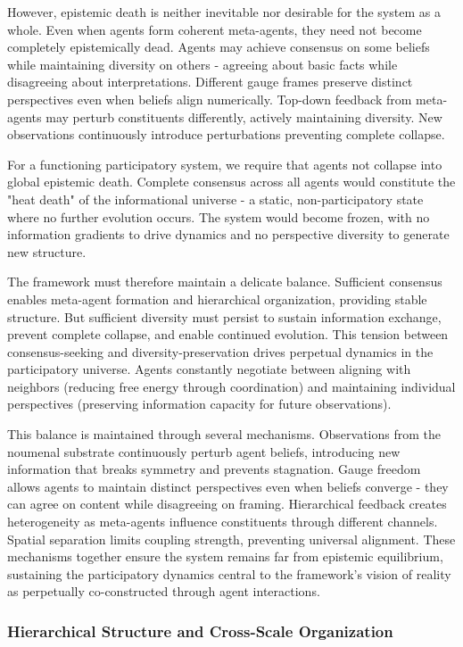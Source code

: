 \documentclass[11pt]{article}
\begin{document}
However, epistemic death is neither inevitable nor desirable for the system as a whole. Even when agents form coherent meta-agents, they need not become completely epistemically dead. Agents may achieve consensus on some beliefs while maintaining diversity on others - agreeing about basic facts while disagreeing about interpretations. Different gauge frames preserve distinct perspectives even when beliefs align numerically. Top-down feedback from meta-agents may perturb constituents differently, actively maintaining diversity. New observations continuously introduce perturbations preventing complete collapse.

For a functioning participatory system, we require that agents not collapse into global epistemic death. Complete consensus across all agents would constitute the "heat death" of the informational universe - a static, non-participatory state where no further evolution occurs. The system would become frozen, with no information gradients to drive dynamics and no perspective diversity to generate new structure.

The framework must therefore maintain a delicate balance. Sufficient consensus enables meta-agent formation and hierarchical organization, providing stable structure. But sufficient diversity must persist to sustain information exchange, prevent complete collapse, and enable continued evolution. This tension between consensus-seeking and diversity-preservation drives perpetual dynamics in the participatory universe. Agents constantly negotiate between aligning with neighbors (reducing free energy through coordination) and maintaining individual perspectives (preserving information capacity for future observations).

This balance is maintained through several mechanisms. Observations from the noumenal substrate continuously perturb agent beliefs, introducing new information that breaks symmetry and prevents stagnation. Gauge freedom allows agents to maintain distinct perspectives even when beliefs converge - they can agree on content while disagreeing on framing. Hierarchical feedback creates heterogeneity as meta-agents influence constituents through different channels. Spatial separation limits coupling strength, preventing universal alignment. These mechanisms together ensure the system remains far from epistemic equilibrium, sustaining the participatory dynamics central to the framework's vision of reality as perpetually co-constructed through agent interactions.

\subsubsection{Hierarchical Structure and Cross-Scale Organization}
\end{document}
